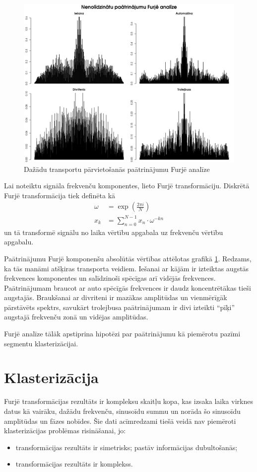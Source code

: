 \documentclass{ludis}
\begin{document}
\begin{figure}
  \centering
  \includegraphics[scale=0.5]{img/fourier_analysis}
  \caption{Dažādu transportu pārvietošanās paātrinājumu Furjē analīze}
  \label{fig:fourier_analysis}
\end{figure}

Lai noteiktu signāla frekvenču komponentes, lieto Furjē transformāciju. Diskrētā Furjē transformācija
tiek definēta kā 
\begin{align*}
  \omega &= \exp \left (\frac{2 \pi i}{N} \right)\\
  x_k &= \sum_{n = 0}^{N - 1} x_n \cdot \omega^{-kn}
\end{align*}
un tā transformē signālu no laika vērtību apgabala uz frekvenču vērtību apgabalu.

Paātrinājumu Furjē komponenšu absolūtās vērtības attēlotas 
grafikā \ref{fig:fourier_analysis}. Redzams, ka tās manāmi atšķiras transporta veidiem. Iešanai ar
kājām ir izteiktas augstās frekvences komponentes un salīdzinoši spēcīgas arī vidējās frekvences.
Paātrinājumam braucot ar auto spēcīgās frekvences ir daudz koncentrētākas tieši augstajās.
Braukšanai ar divriteni ir mazākas amplitūdas un vienmērīgāk pārstāvēts spektrs, savukārt trolejbusa
paātrinājumam ir divi izteikti ``pīķi'' augstajā frekvenču zonā un vidējas amplitūdas.

Furjē analīze tālāk apstiprina hipotēzi par paātrinājumu kā piemērotu pazīmi segmentu 
klasterizācijai. 

\section{Klasterizācija}
Furjē transformācijas rezultāts ir kompleksu skaitļu kopa, kas izsaka laika virknes datus
kā vairāku, dažādu frekvenču, sinusoīdu summu un norāda šo sinusoīdu amplitūdas un fāzes nobīdes.
Šie dati acīmredzami tiešā veidā nav piemēroti klasterizācijas problēmas risināšanai, jo:
\begin{itemize}
\item transformācijas rezultāts ir simetrisks; pastāv informācijas dubultošanās;
\item transformācijas rezultāts ir komplekss.
\end{itemize}
\end{document}
